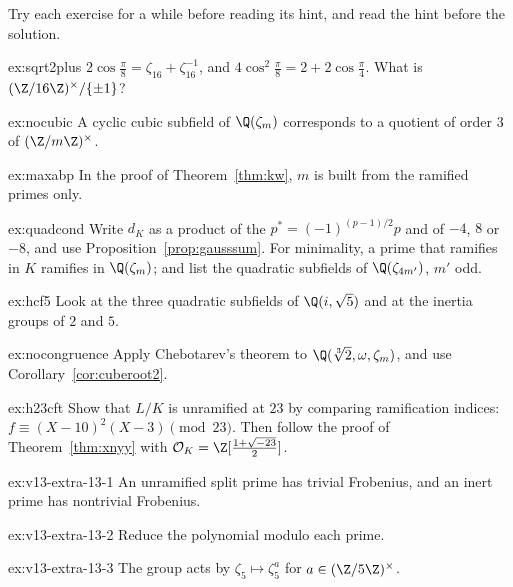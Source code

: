 Try each exercise for a while before reading its hint, and read the hint before the solution.

\begin{hint}{ex:sqrt2plus}
$2\cos\frac\pi8=\zeta_{16}+\zeta_{16}^{-1}$, and $4\cos^2\frac\pi8=2+2\cos\frac\pi4$. What is $(\Z/16\Z)^\times/\{\pm1\}$?
\end{hint}
\begin{hint}{ex:nocubic}
A cyclic cubic subfield of $\Q(\zeta_m)$ corresponds to a quotient of order $3$ of $(\Z/m\Z)^\times$.
\end{hint}
\begin{hint}{ex:maxabp}
In the proof of Theorem~\ref{thm:kw}, $m$ is built from the ramified primes only.
\end{hint}
\begin{hint}{ex:quadcond}
Write $d_K$ as a product of the $p^*=(-1)^{(p-1)/2}p$ and of $-4$, $8$ or $-8$, and use Proposition~\ref{prop:gausssum}. For minimality, a prime that ramifies in
$K$ ramifies in $\Q(\zeta_m)$; and list the quadratic subfields of $\Q(\zeta_{4m'})$, $m'$ odd.
\end{hint}
\begin{hint}{ex:hcf5}
Look at the three quadratic subfields of $\Q(i,\sqrt5)$ and at the inertia groups of $2$ and $5$.
\end{hint}
\begin{hint}{ex:nocongruence}
Apply Chebotarev's theorem to $\Q(\sqrt[3]2,\omega,\zeta_m)$, and use Corollary~\ref{cor:cuberoot2}.
\end{hint}
\begin{hint}{ex:h23cft}
Show that $L/K$ is unramified at $23$ by comparing ramification indices: $f\equiv(X-10)^2(X-3)\pmod{23}$. Then follow the proof of Theorem~\ref{thm:xnyy}
with $\mathcal O_K=\Z[\frac{1+\sqrt{-23}}2]$.
\end{hint}

\begin{hint}{ex:v13-extra-13-1}
An unramified split prime has trivial Frobenius, and an inert prime has nontrivial Frobenius.
\end{hint}

\begin{hint}{ex:v13-extra-13-2}
Reduce the polynomial modulo each prime.
\end{hint}

\begin{hint}{ex:v13-extra-13-3}
The group acts by $\zeta_5\mapsto\zeta_5^a$ for $a\in(\Z/5\Z)^\times$.
\end{hint}

